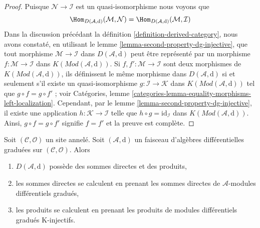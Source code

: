 \begin{proof}
Puisque $\mathcal{N} \to \mathcal{I}$ est un quasi-isomorphisme
nous voyons
que $$
\Hom_{D(\mathcal{A}, \text{d})}(\mathcal{M}, \mathcal{N})
= \Hom_{D(\mathcal{A}, \text{d})}(\mathcal{M}, \mathcal{I})
$$
Dans la discussion précédant la définition \ref{definition-derived-category},
nous avons constaté, en utilisant le lemme \ref{lemma-second-property-dg-injective},
que tout morphisme $\mathcal{M} \to \mathcal{I}$
dans $D(\mathcal{A}, \text{d})$ peut être représenté
par un morphisme $f : \mathcal{M} \to \mathcal{I}$
dans $K(\textit{Mod}(\mathcal{A}, \text{d}))$.
Si $f, f' :  \mathcal{M} \to \mathcal{I}$ sont deux
morphismes de $K(\textit{Mod}(\mathcal{A}, \text{d}))$, ils
définissent le même morphisme dans $D(\mathcal{A}, \text{d})$ si et
seulement s'il existe un quasi-isomorphisme $g : \mathcal{I} \to \mathcal{K}$
dans $K(\textit{Mod}(\mathcal{A}, \text{d}))$
tel que $g \circ f = g \circ f'$ ; voir
Catégories, lemme \ref{categories-lemma-equality-morphisms-left-localization}.
Cependant, par le lemme \ref{lemma-second-property-dg-injective}, il
existe une
application $h : \mathcal{K} \to \mathcal{I}$
telle que $h \circ g = \text{id}_\mathcal{I}$
dans $K(\textit{Mod}(\mathcal{A}, \text{d}))$.
Ainsi, $g \circ f = g \circ f'$ signifie $f = f'$ et
la preuve est complète.
\end{proof}

\begin{lemma}
\label{lemma-derived-products} Soit
$(\mathcal{C}, \mathcal{O})$ un site annelé. Soit
$(\mathcal{A}, \text{d})$ un faisceau d'algèbres différentielles graduées sur
$(\mathcal{C}, \mathcal{O})$. Alors
\begin{enumerate}
\item $D(\mathcal{A}, \text{d})$ possède des sommes directes et des produits,
\item les sommes directes se calculent en prenant les sommes directes de
$\mathcal{A}$-modules différentiels gradués,
\item les produits se calculent en prenant les produits
de modules différentiels gradués K-injectifs.
\end{enumerate}
\end{lemma}

